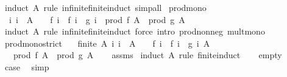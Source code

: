 \begin{isabellebody}
\ {\isacharparenleft}{\kern0pt}induct\ A\ rule{\isacharcolon}{\kern0pt}\ infinite{\isacharunderscore}{\kern0pt}finite{\isacharunderscore}{\kern0pt}induct{\isacharparenright}{\kern0pt}\ simp{\isacharunderscore}{\kern0pt}all%
\endisatagproof
{\isafoldproof}%
%
\isadelimproof
\isanewline
%
\endisadelimproof
\isanewline
{}\isamarkupfalse%
\ prod{\isacharunderscore}{\kern0pt}mono{\isacharcolon}{\kern0pt}\isanewline
\ \ {\isachardoublequoteopen}{\isacharparenleft}{\kern0pt}{\isasymAnd}i{\isachardot}{\kern0pt}\ i\ {\isasymin}\ A\ {\isasymLongrightarrow}\ {}\ {\isasymle}\ f\ i\ {\isasymand}\ f\ i\ {\isasymle}\ g\ i{\isacharparenright}{\kern0pt}\ {\isasymLongrightarrow}\ prod\ f\ A\ {\isasymle}\ prod\ g\ A{\isachardoublequoteclose}\isanewline
%
\isadelimproof
\ \ %
\endisadelimproof
%
\isatagproof
{}\isamarkupfalse%
\ {\isacharparenleft}{\kern0pt}induct\ A\ rule{\isacharcolon}{\kern0pt}\ infinite{\isacharunderscore}{\kern0pt}finite{\isacharunderscore}{\kern0pt}induct{\isacharparenright}{\kern0pt}\ {\isacharparenleft}{\kern0pt}force\ intro{\isacharbang}{\kern0pt}{\isacharcolon}{\kern0pt}\ prod{\isacharunderscore}{\kern0pt}nonneg\ mult{\isacharunderscore}{\kern0pt}mono{\isacharparenright}{\kern0pt}{\isacharplus}{\kern0pt}%
\endisatagproof
{\isafoldproof}%
%
\isadelimproof
\isanewline
%
\endisadelimproof
\isanewline
{}\isamarkupfalse%
\ prod{\isacharunderscore}{\kern0pt}mono{\isacharunderscore}{\kern0pt}strict{\isacharcolon}{\kern0pt}\isanewline
\ \ \ {\isachardoublequoteopen}finite\ A{\isachardoublequoteclose}\ {\isachardoublequoteopen}{\isasymAnd}i{\isachardot}{\kern0pt}\ i\ {\isasymin}\ A\ {\isasymLongrightarrow}\ {}\ {\isasymle}\ f\ i\ {\isasymand}\ f\ i\ {\isacharless}{\kern0pt}\ g\ i{\isachardoublequoteclose}\ {\isachardoublequoteopen}A\ {\isasymnoteq}\ {\isacharbraceleft}{\kern0pt}{\isacharbraceright}{\kern0pt}{\isachardoublequoteclose}\isanewline
\ \ \ {\isachardoublequoteopen}prod\ f\ A\ {\isacharless}{\kern0pt}\ prod\ g\ A{\isachardoublequoteclose}\isanewline
%
\isadelimproof
\ \ %
\endisadelimproof
%
\isatagproof
{}\isamarkupfalse%
\ assms\isanewline
{}\isamarkupfalse%
\ {\isacharparenleft}{\kern0pt}induct\ A\ rule{\isacharcolon}{\kern0pt}\ finite{\isacharunderscore}{\kern0pt}induct{\isacharparenright}{\kern0pt}\isanewline
\ \ \isamarkupfalse%
\ empty\isanewline
\ \ \isamarkupfalse%
\ \isamarkupfalse%
\ {\isacharquery}{\kern0pt}case\ \isamarkupfalse%
\ simp\isanewline

\end{isabellebody}
